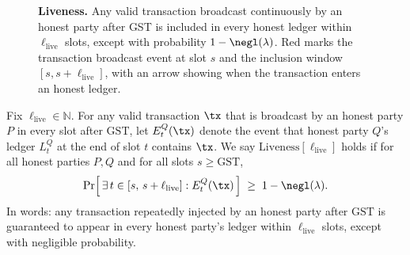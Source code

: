 \begin{figure}[htp!]
\centering
{}
\caption{\textbf{Liveness.} 
\small
Any valid transaction broadcast continuously by an honest party after GST is included in every honest ledger within $\ell_{\mathrm{live}}$ slots, except with probability $1-\negl(\lambda)$. 
Red marks the transaction broadcast event at slot $s$ and the inclusion window $[s,s+\ell_{\mathrm{live}}]$, with an arrow showing when the transaction enters an honest ledger.}

\label{fig:liveness}
\end{figure}


\begin{definition}[Liveness]
Fix $\ell_{\mathrm{live}} \in \mathbb{N}$. For any valid transaction $\tx$ that is
broadcast by an honest party $P$ in every slot after $\mathrm{GST}$, let
$E_t^Q(\tx)$ denote the event that honest party $Q$'s ledger $L_t^Q$ at the end of slot $t$
contains $\tx$. We say $\mathrm{Liveness}[\ell_{\mathrm{live}}]$ holds if for all honest parties $P,Q$
and for all slots $s \ge \mathrm{GST}$,
\[
\Pr\!\Big[\, \exists\, t \in [s,\,s+\ell_{\mathrm{live}}] : E_t^Q(\tx) \,\Big] \;\ge\; 1-\negl(\lambda).
\]
In words: any transaction repeatedly injected by an honest party after $\mathrm{GST}$
is guaranteed to appear in every honest party’s ledger within $\ell_{\mathrm{live}}$ slots,
except with negligible probability.
\end{definition}

